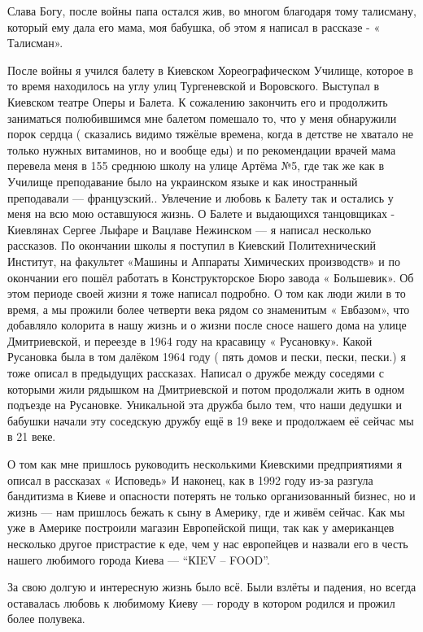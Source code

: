 Слава Богу, после войны папа остался жив, во многом благодаря тому талисману,
который ему дала его мама, моя бабушка, об этом я  написал в рассказе - «
Талисман».

После войны я учился балету в Киевском Хореографическом Училище, которое в то
время находилось на углу улиц Тургеневской и Воровского. Выступал в Киевском
театре Оперы и Балета. К сожалению закончить его и продолжить заниматься
полюбившимся мне балетом  помешало то, что у меня обнаружили порок сердца (
сказались видимо тяжёлые времена, когда в детстве не хватало не только нужных
витаминов, но и вообще еды) и по рекомендации врачей мама перевела меня в 155
среднюю школу на улице Артёма №5, где так же как в Училище преподавание было на
украинском языке и  как иностранный преподавали — французский.. Увлечение и
любовь к Балету так и остались у меня  на всю мою оставшуюся жизнь. О Балете и
выдающихся танцовщиках  -  Киевлянах Сергее Лыфаре и Вацлаве Нежинском — я
написал несколько рассказов. По окончании школы я поступил в Киевский
Политехнический Институт, на факультет  «Машины и Аппараты Химических
производств»  и  по окончании его  пошёл работать в Конструкторское Бюро завода
« Большевик».  Об этом периоде своей жизни я тоже написал  подробно.  О том как
люди жили в то время, а мы прожили  более четверти века рядом со знаменитым «
Евбазом», что добавляло колорита в  нашу жизнь  и о жизни  после  сносе нашего
дома на улице  Дмитриевской, и  переезде в 1964 году на  красавицу «
Русановку».  Какой  Русановка  была в том далёком 1964  году  ( пять домов и
пески, пески, пески.) я тоже описал в предыдущих рассказах. Написал о  дружбе
между соседями с которыми жили рядышком на Дмитриевской и  потом продолжали
жить в одном подъезде на Русановке.  Уникальной эта дружба было тем, что наши
дедушки и бабушки начали эту соседскую дружбу ещё в 19 веке и продолжаем её
сейчас мы в 21 веке.

О том как мне пришлось руководить несколькими Киевскими  предприятиями я описал
в рассказах « Исповедь» И наконец, как в 1992 году из-за разгула бандитизма в
Киеве и опасности потерять не только  организованный бизнес, но и жизнь — нам
пришлось бежать к сыну в Америку, где и живём сейчас. Как мы уже в Америке
построили магазин  Европейской  пищи, так как у американцев несколько другое
пристрастие к еде, чем у нас европейцев  и назвали его в честь нашего любимого
города  Киева — \enquote{КIEV – FOOD}.                                        

За свою долгую и интересную жизнь было всё. Были взлёты и падения, но всегда
оставалась любовь к любимому Киеву — городу в котором родился и прожил более
полувека.

